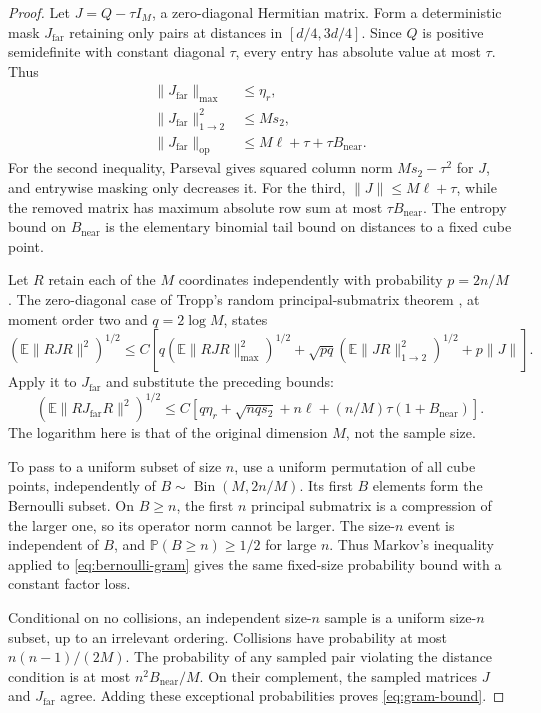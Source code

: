 \begin{proof}
Let $J=Q-\tau I_M$, a zero-diagonal Hermitian matrix. Form a deterministic
mask $J_{\mathrm{far}}$ retaining only pairs at distances in
$[d/4,3d/4]$. Since $Q$ is positive semidefinite with constant diagonal
$\tau$, every entry has absolute value at most $\tau$. Thus
\begin{align*}
 \|J_{\mathrm{far}}\|_{\max}&\le\eta_r,\\
 \|J_{\mathrm{far}}\|_{1\to2}^2&\le M s_2,\\
 \|J_{\mathrm{far}}\|_{\mathrm{op}}
 &\le M\ell+\tau+\tau B_{\mathrm{near}}.
\end{align*}
For the second inequality, Parseval gives squared column norm
$M s_2-\tau^2$ for $J$, and entrywise masking only decreases it.
For the third, $\|J\|\le M\ell+\tau$, while the removed matrix has
maximum absolute row sum at most $\tau B_{\mathrm{near}}$.
The entropy bound on $B_{\mathrm{near}}$ is the elementary binomial
tail bound on distances to a fixed cube point.

Let $R$ retain each of the $M$ coordinates independently with
probability $p=2n/M$. The zero-diagonal case of Tropp's random
principal-submatrix theorem \cite[Theorem 1.1]{tropp2008}, at moment
order two and $q=2\log M$, states
\[
 (\mathbb E\|RJR\|^2)^{1/2}
 \le C\left[q(\mathbb E\|RJR\|_{\max}^2)^{1/2}
       +\sqrt{pq}(\mathbb E\|JR\|_{1\to2}^2)^{1/2}
       +p\|J\|\right].
\]
Apply it to $J_{\mathrm{far}}$ and substitute the preceding bounds:
\begin{equation}\label{eq:bernoulli-gram}
 (\mathbb E\|R J_{\mathrm{far}}R\|^2)^{1/2}
 \le C[q\eta_r+\sqrt{nq s_2}+n\ell
               +(n/M)\tau(1+B_{\mathrm{near}})].
\end{equation}
The logarithm here is that of the original dimension $M$, not the
sample size.

To pass to a uniform subset of size $n$, use a uniform permutation of
all cube points, independently of $B\sim\operatorname{Bin}(M,2n/M)$.
Its first $B$ elements form the Bernoulli subset. On $B\ge n$, the
first $n$ principal submatrix is a compression of the larger one, so
its operator norm cannot be larger. The size-$n$ event is independent
of $B$, and $\mathbb P(B\ge n)\ge1/2$ for large $n$. Thus Markov's
inequality applied to \eqref{eq:bernoulli-gram} gives the same fixed-size
probability bound with a constant factor loss.

Conditional on no collisions, an independent size-$n$ sample is a
uniform size-$n$ subset, up to an irrelevant ordering. Collisions have
probability at most $n(n-1)/(2M)$. The probability of any sampled pair
violating the distance condition is at most $n^2B_{\mathrm{near}}/M$.
On their complement, the sampled matrices $J$ and $J_{\mathrm{far}}$
agree. Adding these exceptional probabilities proves
\eqref{eq:gram-bound}.
\end{proof}

